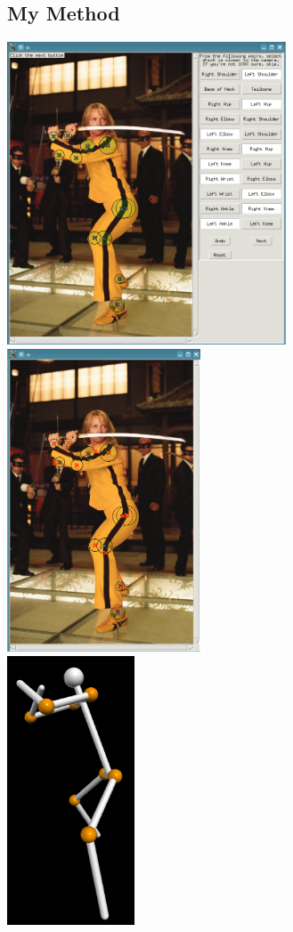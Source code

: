 \documentclass[final]{article}
\begin{document}
\begin{spacing}{1.1}
\subsection{My Method}
\begin{center}
  \includegraphics[height=9cm]{fig/mykillbill.png}
  \includegraphics[height=9cm]{fig/mykillbillopt.png} \\
  \includegraphics[height=8cm]{fig/mykillbillrecons.png}

\end{center}
\end{spacing}
\end{document}
